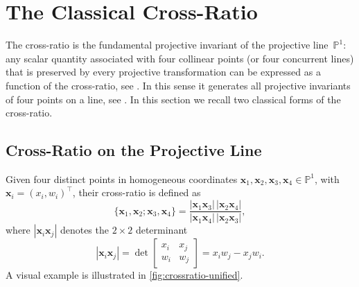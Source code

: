 \documentclass{birkjour}
\theoremstyle{definition}
\theoremstyle{remark}
\begin{document}
\section{The Classical Cross-Ratio}
\label{sec:classical}


The cross-ratio is the fundamental projective invariant of the
projective line~$\mathbb{P}^1$: any scalar quantity associated with
four collinear points (or four concurrent lines) that is preserved by
every projective transformation can be expressed as a function of the
cross-ratio, see \cite[Sect.~5.8]{stillwell}. In this sense it generates all projective invariants of four points on a line, see \cite[Sect.~2.5]{hartley2003multiple}.
In this section we recall two classical forms of the cross-ratio.

\subsection{Cross-Ratio on the Projective Line}
\label{sec:proj-cr}

Given four distinct points in homogeneous coordinates $\mathbf{x}_1, \mathbf{x}_2, \mathbf{x}_3, \mathbf{x}_4 \in \mathbb{P}^1$, with $\mathbf{x}_i = (x_i, w_i)^\top$, their cross-ratio is defined as
\begin{equation}
  \{\mathbf{x}_1, \mathbf{x}_2; \mathbf{x}_3, \mathbf{x}_4\}
  = \frac{|\mathbf{x}_1\mathbf{x}_3|\,|\mathbf{x}_2\mathbf{x}_4|}
         {|\mathbf{x}_1\mathbf{x}_4|\,|\mathbf{x}_2\mathbf{x}_3|},
\end{equation}
where $|\mathbf{x}_i\mathbf{x}_j|$ denotes the $2\times 2$ determinant
\begin{equation}
  |\mathbf{x}_i\mathbf{x}_j|
  = \det\begin{bmatrix} x_i & x_j \\ w_i & w_j \end{bmatrix}
  = x_i w_j - x_j w_i.
\end{equation}
A visual example is illustrated in \cref{fig:crossratio-unified}.
\end{document}
